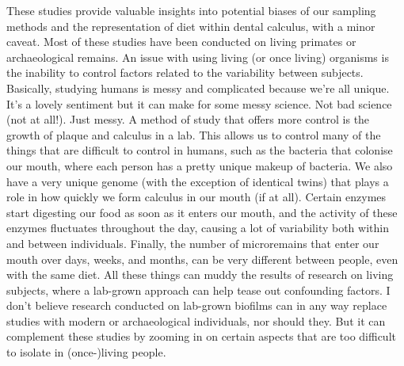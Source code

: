 \documentclass[
  b5paper,
]{book}
\begin{document}
These studies provide valuable insights into potential biases of our
sampling methods and the representation of diet within dental calculus,
with a minor caveat. Most of these studies have been conducted on living
primates or archaeological remains. An issue with using living (or once
living) organisms is the inability to control factors related to the
variability between subjects. Basically, studying humans is messy and
complicated because we're all unique. It's a lovely sentiment but it can
make for some messy science. Not bad science (not at all!). Just messy.
A method of study that offers more control is the growth of plaque and
calculus in a lab. This allows us to control many of the things that are
difficult to control in humans, such as the bacteria that colonise our
mouth, where each person has a pretty unique makeup of bacteria. We also
have a very unique genome (with the exception of identical twins) that
plays a role in how quickly we form calculus in our mouth (if at all).
Certain enzymes start digesting our food as soon as it enters our mouth,
and the activity of these enzymes fluctuates throughout the day, causing
a lot of variability both within and between individuals. Finally, the
number of microremains that enter our mouth over days, weeks, and
months, can be very different between people, even with the same diet.
All these things can muddy the results of research on living subjects,
where a lab-grown approach can help tease out confounding factors. I
don't believe research conducted on lab-grown biofilms can in any way
replace studies with modern or archaeological individuals, nor should
they. But it can complement these studies by zooming in on certain
aspects that are too difficult to isolate in (once-)living people.
\end{document}
